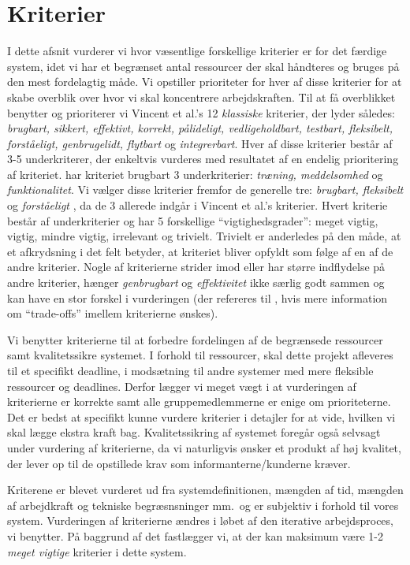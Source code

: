 \section{Kriterier}
I dette afsnit vurderer vi hvor væsentlige forskellige kriterier er for det færdige system, idet vi har et begrænset antal ressourcer der skal håndteres og bruges på den mest fordelagtig måde. Vi opstiller prioriteter for hver af disse kriterier for at skabe overblik over hvor vi skal koncentrere arbejdskraften. Til at få overblikket benytter og prioriterer vi Vincent et al.'s 12 \emph{klassiske} kriterier, der lyder således: \emph{brugbart, sikkert, effektivt, korrekt, pålideligt, vedligeholdbart, testbart, fleksibelt, forståeligt, genbrugelidt, flytbart} og \emph{integrerbart}. Hver af disse kriterier består af 3-5 underkriterer, der enkeltvis vurderes med resultatet af en endelig prioritering af kriteriet. \Fx har kriteriet brugbart 3 underkriterier: \emph{træning, meddelsomhed} og \emph{funktionalitet}. Vi vælger disse kriterier fremfor de generelle tre: \emph{brugbart, fleksibelt} og \emph{forståeligt} \cite{crit}, da de 3 allerede indgår i Vincent et al.'s kriterier. Hvert kriterie består af underkriterier og har 5 forskellige ``vigtighedsgrader'': meget vigtig, vigtig, mindre vigtig, irrelevant og trivielt. Trivielt er anderledes på den måde, at et afkrydsning i det felt betyder, at kriteriet bliver opfyldt som følge af en af de andre kriterier. Nogle af kriterierne strider imod eller har større indflydelse på andre kriterier, \fx hænger \emph{genbrugbart} og \emph{effektivitet} ikke særlig godt sammen og kan have en stor forskel i vurderingen (der refereres til \cite[s.~18]{crit}, hvis mere information om ``trade-offs'' imellem kriterierne ønskes).

Vi benytter kriterierne til at forbedre fordelingen af de begrænsede ressourcer samt kvalitetssikre systemet. I forhold til ressourcer, skal dette projekt afleveres til et specifikt deadline, i modsætning til andre systemer med mere fleksible ressourcer og deadlines. Derfor lægger vi meget vægt i at vurderingen af kriterierne er korrekte samt alle gruppemedlemmerne er enige om prioriteterne. Det er bedst at specifikt kunne vurdere kriterier i detajler for at vide, hvilken vi skal lægge ekstra kraft bag. Kvalitetssikring af systemet foregår også selvsagt under vurdering af kriterierne, da vi naturligvis ønsker et produkt af høj kvalitet, der lever op til de opstillede krav som informanterne/kunderne kræver.

Kriterene er blevet vurderet ud fra systemdefinitionen, mængden af tid, mængden af arbejdkraft og tekniske begræsnsninger mm.\ og er subjektiv i forhold til vores system. Vurderingen af kriterierne ændres i løbet af den iterative arbejdsproces, vi benytter. På baggrund af det fastlægger vi, at der kan maksimum være 1-2 \emph{meget vigtige} kriterier i dette system.

